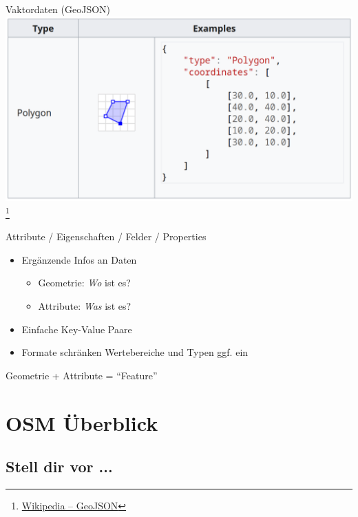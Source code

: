 \documentclass{beamer}
\begin{document}
		\begin{frame}{Vaktordaten (GeoJSON)}
			\includegraphics[width=\textwidth]{images/geodata-vector-2.png}\footnote{\href{https://en.wikipedia.org/wiki/GeoJSON}{Wikipedia -- GeoJSON}}
		\end{frame}
		
		\begin{frame}{Attribute / Eigenschaften / Felder / Properties}
			\begin{itemize}
				\item Ergänzende Infos an Daten
				\begin{itemize}
					\item Geometrie: \textit{Wo} ist es?
					\item Attribute: \textit{Was} ist es?
				\end{itemize}\pause
				\item Einfache Key-Value Paare\pause
				\item Formate schränken Wertebereiche und Typen ggf. ein
			\end{itemize}
			\pause
			\vspace{0.5cm}
			\begin{center}
				Geometrie + Attribute = \enquote{Feature}
			\end{center}
		\end{frame}
		
	\section{OSM Überblick}
	
		\begin{frame}
			\tableofcontents[currentsection]
		\end{frame}
	
		\subsection{Stell dir vor ...}
			
\end{document}
